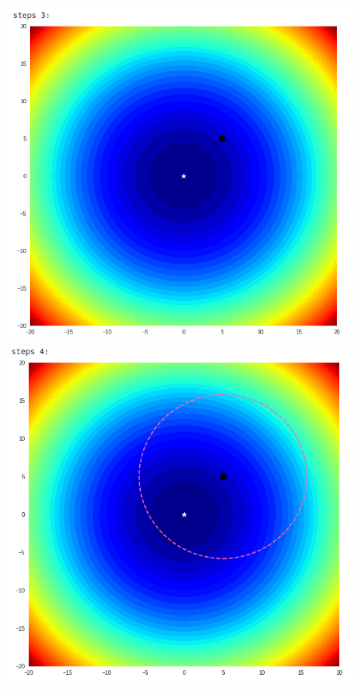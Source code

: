 \documentclass{book}
\begin{document}
\begin{itemize}
\begin{figure}[H]
\begin{figure}[H]
\begin{minipage}[c]{0.3\textwidth}
            \end{minipage}
        \end{figure}
        \begin{figure}[H]
            \begin{minipage}[c]{0.3\textwidth}
                \centering
                \includegraphics[width=\textwidth]{images/one_plus_one_ex_step_3.png}
            \end{minipage}
            \begin{minipage}[c]{0.3\textwidth}
                \centering
                \includegraphics[width=\textwidth]{images/one_plus_one_ex_step_4.png}

\end{minipage}
\end{figure}
\end{figure}
\end{itemize}
\end{document}
